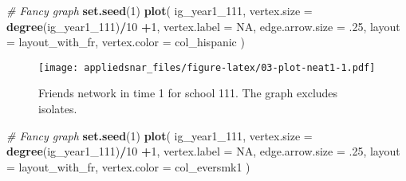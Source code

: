 \documentclass[]{book}
\newenvironment{Shaded}{\begin{snugshade}}{\end{snugshade}}
\newcommand{\KeywordTok}[1]{\textcolor[rgb]{0.13,0.29,0.53}{\textbf{#1}}}
\newcommand{\DataTypeTok}[1]{\textcolor[rgb]{0.13,0.29,0.53}{#1}}
\newcommand{\DecValTok}[1]{\textcolor[rgb]{0.00,0.00,0.81}{#1}}
\newcommand{\StringTok}[1]{\textcolor[rgb]{0.31,0.60,0.02}{#1}}
\newcommand{\CommentTok}[1]{\textcolor[rgb]{0.56,0.35,0.01}{\textit{#1}}}
\newcommand{\OtherTok}[1]{\textcolor[rgb]{0.56,0.35,0.01}{#1}}
\newcommand{\OperatorTok}[1]{\textcolor[rgb]{0.81,0.36,0.00}{\textbf{#1}}}
\newcommand{\NormalTok}[1]{#1}
\theoremstyle{definition}
\theoremstyle{definition}
\theoremstyle{definition}
\theoremstyle{remark}
\begin{document}
\begin{Shaded}
\begin{Highlighting}[]
\CommentTok{# Fancy graph}
\KeywordTok{set.seed}\NormalTok{(}\DecValTok{1}\NormalTok{)}
\KeywordTok{plot}\NormalTok{(}
\NormalTok{  ig_year1_}\DecValTok{111}\NormalTok{,}
  \DataTypeTok{vertex.size     =} \KeywordTok{degree}\NormalTok{(ig_year1_}\DecValTok{111}\NormalTok{)}\OperatorTok{/}\DecValTok{10} \OperatorTok{+}\DecValTok{1}\NormalTok{,}
  \DataTypeTok{vertex.label    =} \OtherTok{NA}\NormalTok{,}
  \DataTypeTok{edge.arrow.size =}\NormalTok{ .}\DecValTok{25}\NormalTok{,}
  \DataTypeTok{layout          =}\NormalTok{ layout_with_fr,}
  \DataTypeTok{vertex.color    =}\NormalTok{ col_hispanic}
\NormalTok{  )}
\end{Highlighting}
\end{Shaded}

\begin{figure}
\centering
\texttt{[image: appliedsnar\_files/figure-latex/03-plot-neat1-1.pdf]}
\caption{\label{fig:03-plot-neat1}Friends network in time 1 for school 111.
The graph excludes isolates.}
\end{figure}

\begin{Shaded}
\end{Shaded}

\begin{Shaded}
\begin{Highlighting}[]
\CommentTok{# Fancy graph}
\KeywordTok{set.seed}\NormalTok{(}\DecValTok{1}\NormalTok{)}
\KeywordTok{plot}\NormalTok{(}
\NormalTok{  ig_year1_}\DecValTok{111}\NormalTok{,}
  \DataTypeTok{vertex.size     =} \KeywordTok{degree}\NormalTok{(ig_year1_}\DecValTok{111}\NormalTok{)}\OperatorTok{/}\DecValTok{10} \OperatorTok{+}\DecValTok{1}\NormalTok{,}
  \DataTypeTok{vertex.label    =} \OtherTok{NA}\NormalTok{,}
  \DataTypeTok{edge.arrow.size =}\NormalTok{ .}\DecValTok{25}\NormalTok{,}
  \DataTypeTok{layout          =}\NormalTok{ layout_with_fr,}
  \DataTypeTok{vertex.color    =}\NormalTok{ col_eversmk1}
\NormalTok{  )}
\end{Highlighting}
\end{Shaded}
\end{document}
